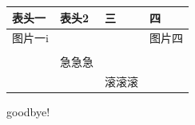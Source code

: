 \documentclass[UTF8,12pt,a4paper,oneside]{ctexart}
\begin{document}
\begin{table}[htbp]
    \centering
    \begin{tabular}{llll} 
    \hline
    表头一  & 表头2 & 三                    & 四    \\ 
    \hline
    图片一i &     &                      & 图片四  \\
         &     & \multicolumn{1}{c}{} &      \\
         & 急急急 &                      &      \\
         &     & 滚滚滚                  &      \\
    \hline
    \end{tabular}
    \end{table}
goodbye!
\end{document}
